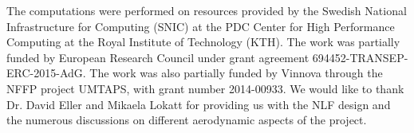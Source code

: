 The computations were performed on resources provided by the Swedish National Infrastructure for Computing (SNIC) at the PDC Center for High Performance Computing at the Royal Institute of Technology (KTH). The work was partially funded by European Research Council under grant agreement 694452-TRANSEP-ERC-2015-AdG. The work was also partially funded by Vinnova through the NFFP project UMTAPS, with grant number 2014-00933. We would like to thank Dr. David Eller and Mikaela Lokatt for providing us with the NLF design and the numerous discussions on different aerodynamic aspects of the project.



%
%



%
